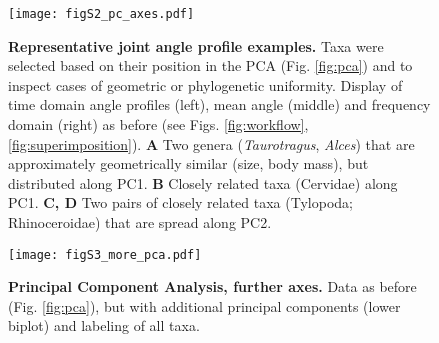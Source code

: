 \documentclass[9pt,twoside,lineno]{pnas-new}
\begin{document}
\pagebreak
\begin{figure}[pt]
\centering
\texttt{[image: figS2\_pc\_axes.pdf]}
\caption[Representative Examples]{\textbf{Representative joint angle profile examples.} 
Taxa were selected based on their position in the PCA (Fig. \ref*{fig:pca}) and to inspect cases of geometric or phylogenetic uniformity. 
Display of time domain angle profiles (left), mean angle (middle) and frequency domain (right) as before (see Figs. \ref*{fig:workflow}, \ref*{fig:superimposition}). 
\textbf{A} Two genera (\textit{Taurotragus}, \textit{Alces}) that are approximately geometrically similar (size, body mass), but distributed along PC1. %
\textbf{B} Closely related taxa (Cervidae) along PC1. 
\textbf{C, D} Two pairs of closely related taxa (Tylopoda; Rhinoceroidae) that are spread along PC2.  
 }
\label{fig:examples}
\end{figure}

\pagebreak
\begin{figure}[pt]
\centering
\texttt{[image: figS3\_more\_pca.pdf]}
\caption[Further PC Axes]{\textbf{Principal Component Analysis, further axes.} Data as before (Fig. \ref*{fig:pca}), but with additional principal components (lower biplot) and labeling of all taxa.
 }
\label{fig:more_pca}
\end{figure}



\FloatBarrier

%
\label{supp:movie1}

\label{supp:tutorial}

\label{supp:data1}

\label{supp:data2}





\end{document}
